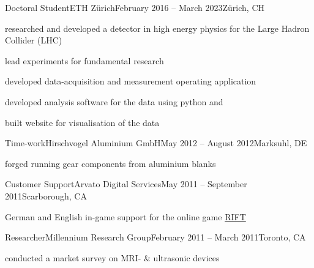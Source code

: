 \begin{cveventi}{Doctoral Student}{ETH Zürich}{February 2016 -- March 2023}{Z\"urich, CH}
  \item researched and developed a detector in high energy physics for the Large Hadron Collider (LHC)
  \item lead experiments for fundamental research
  \item developed data-acquisition and measurement operating application
  \item developed analysis software for the data using python and \cpp
  \item built website for visualisation of the data
\end{cveventi}
\divider
\begin{cveventis}{Time-work}{Hirschvogel Aluminium GmbH}{May 2012 -- August 2012}{Marksuhl, DE}
  \item forged running gear components from aluminium blanks
\end{cveventis}
%
\divider
%
\begin{cveventis}{Customer Support}{Arvato Digital Services}{May 2011 -- September 2011}{Scarborough, CA}
  \item German and English in-game support for the online game \href{https://www.trionworlds.com/rift/en/}{RIFT}
\end{cveventis}
%
\divider
%
\begin{cveventis}{Researcher}{Millennium Research Group}{February 2011 -- March 2011}{Toronto, CA}
  \item conducted a market survey on MRI- \& ultrasonic devices
\end{cveventis}
